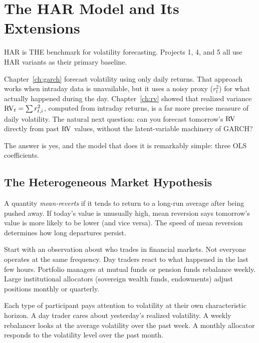 \chapter{The HAR Model and Its Extensions}
\label{ch:har}

\begin{application}
HAR is THE benchmark for volatility forecasting.
Projects 1, 4, and 5 all use HAR variants as their primary baseline.
\end{application}

Chapter~\ref{ch:garch} forecast volatility using only daily returns.
That approach works when intraday data is unavailable, but it uses a noisy proxy ($r^2_t$) for what actually happened during the day.
Chapter~\ref{ch:rv} showed that realized variance $\operatorname{RV}_t = \sum r^2_{t,i}$, computed from intraday returns, is a far more precise measure of daily volatility.
The natural next question: can you forecast tomorrow's $\operatorname{RV}$ directly from past $\operatorname{RV}$ values, without the latent-variable machinery of GARCH?

The answer is yes, and the model that does it is remarkably simple: three OLS coefficients.


\section{The Heterogeneous Market Hypothesis}
\label{sec:hmh}

\begin{prereq}
A quantity \emph{mean-reverts} if it tends to return to a long-run average after being pushed away.
If today's value is unusually high, mean reversion says tomorrow's value is more likely to be lower (and vice versa).
The speed of mean reversion determines how long departures persist.
\end{prereq}

Start with an observation about who trades in financial markets.
Not everyone operates at the same frequency.
Day traders react to what happened in the last few hours.
Portfolio managers at mutual funds or pension funds rebalance weekly.
Large institutional allocators (sovereign wealth funds, endowments) adjust positions monthly or quarterly.

Each type of participant pays attention to volatility at their own characteristic horizon.
A day trader cares about yesterday's realized volatility.
A weekly rebalancer looks at the average volatility over the past week.
A monthly allocator responds to the volatility level over the past month.

